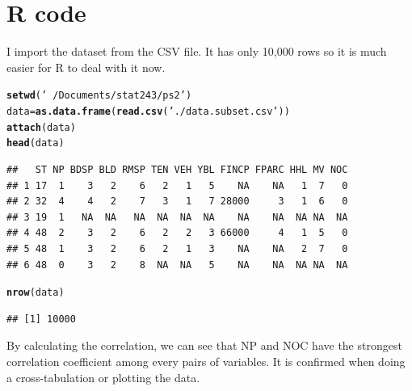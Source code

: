 \documentclass{llncs}\usepackage[]{graphicx}\usepackage[]{color}
\makeatletter
\newcommand{\hlstr}[1]{\textcolor[rgb]{0.192,0.494,0.8}{#1}}%
\newcommand{\hlstd}[1]{\textcolor[rgb]{0.345,0.345,0.345}{#1}}%
\newcommand{\hlkwb}[1]{\textcolor[rgb]{0.69,0.353,0.396}{#1}}%
\newcommand{\hlkwd}[1]{\textcolor[rgb]{0.737,0.353,0.396}{\textbf{#1}}}%
\newenvironment{kframe}{%
 \def\at@end@of@kframe{}%
 \ifinner\ifhmode%
  \def\at@end@of@kframe{\end{minipage}}%
  \begin{minipage}{\columnwidth}%
 \fi\fi%
 \def\FrameCommand##1{\hskip\@totalleftmargin \hskip-\fboxsep
 \colorbox{shadecolor}{##1}\hskip-\fboxsep
     \hskip-\linewidth \hskip-\@totalleftmargin \hskip\columnwidth}%
 \MakeFramed {\advance\hsize-\width
   \@totalleftmargin\z@ \linewidth\hsize
   \@setminipage}}%
 {\par\unskip\endMakeFramed%
 \at@end@of@kframe}
\newenvironment{knitrout}{}{} %
\makeatother
\begin{document}
\section{R code}
I import the dataset from the CSV file. It has only 10,000 rows so it is much easier for R to deal with it now.
\begin{knitrout}
\color{fgcolor}\begin{kframe}
\begin{alltt}
\hlkwd{setwd}\hlstd{(}\hlstr{'~/Documents/stat243/ps2'}\hlstd{)}
\hlstd{data}\hlkwb{=}\hlkwd{as.data.frame}\hlstd{(}\hlkwd{read.csv}\hlstd{(}\hlstr{'./data.subset.csv'}\hlstd{))}
\hlkwd{attach}\hlstd{(data)}
\hlkwd{head}\hlstd{(data)}
\end{alltt}
\begin{verbatim}
##   ST NP BDSP BLD RMSP TEN VEH YBL FINCP FPARC HHL MV NOC
## 1 17  1    3   2    6   2   1   5    NA    NA   1  7   0
## 2 32  4    4   2    7   3   1   7 28000     3   1  6   0
## 3 19  1   NA  NA   NA  NA  NA  NA    NA    NA  NA NA  NA
## 4 48  2    3   2    6   2   2   3 66000     4   1  5   0
## 5 48  1    3   2    6   2   1   3    NA    NA   2  7   0
## 6 48  0    3   2    8  NA  NA   5    NA    NA  NA NA  NA
\end{verbatim}
\begin{alltt}
\hlkwd{nrow}\hlstd{(data)}
\end{alltt}
\begin{verbatim}
## [1] 10000
\end{verbatim}
\end{kframe}
\end{knitrout}
\noindent
By calculating the correlation, we can see that NP and NOC have the strongest correlation coefficient among every pairs of variables. It is confirmed when doing a cross-tabulation or plotting the data.
\end{document}
